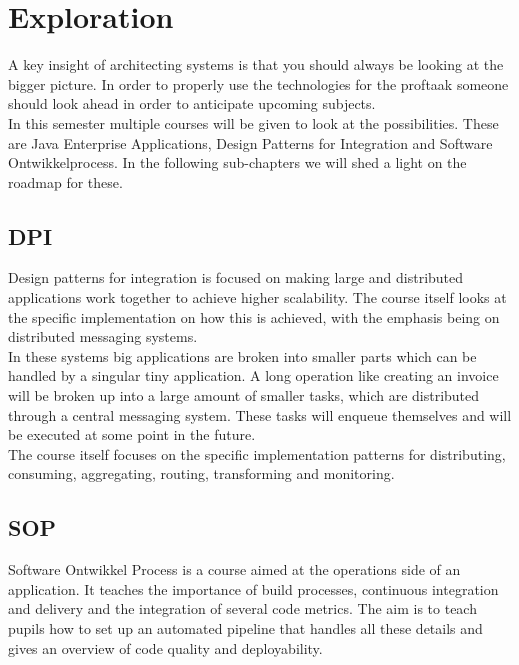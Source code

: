 \chapter{Exploration}

A key insight of architecting systems is that you should always be looking at the bigger picture. In order to properly use the  technologies for the proftaak someone should look ahead in order to anticipate upcoming subjects. \\

In this semester multiple courses will be given to look at the possibilities. These are Java Enterprise Applications, Design Patterns for Integration and Software Ontwikkelprocess. In the following sub-chapters we will shed a light on the roadmap for these.

\section{DPI}

Design patterns for integration is focused on making large and distributed applications work together to achieve higher scalability. The course itself looks at the specific implementation on how this is achieved, with the emphasis being on distributed messaging systems. \\ 

In these systems big applications are broken into smaller parts which can be handled by a singular tiny application. A long operation like creating an invoice will be broken up into a large amount of smaller tasks, which are distributed through a central messaging system. These tasks will enqueue themselves and will be executed at some point in the future. \\

The course itself focuses on the specific implementation patterns for distributing, consuming, aggregating, routing, transforming and monitoring.

\section{SOP}

Software Ontwikkel Process is a course aimed at the operations side of an application. It teaches the importance of build processes, continuous integration and delivery and the integration of several code metrics. The aim is to teach pupils how to set up an automated pipeline that handles all these details and gives an overview of code quality and deployability.

